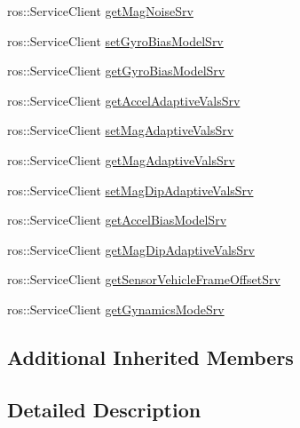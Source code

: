 \begin{DoxyCompactItemize}
\item 
ros\+::\+Service\+Client \hyperlink{classmicrostrain__mips__client_1_1ClMicrostainMips_affa7889c18ffeb92257cc63d1308a499}{get\+Mag\+Noise\+Srv}
\item 
ros\+::\+Service\+Client \hyperlink{classmicrostrain__mips__client_1_1ClMicrostainMips_a1a17a5d7fb3a071a779d2f1cd0e8a7e3}{set\+Gyro\+Bias\+Model\+Srv}
\item 
ros\+::\+Service\+Client \hyperlink{classmicrostrain__mips__client_1_1ClMicrostainMips_a63c964670a09edd036930cde7709e65e}{get\+Gyro\+Bias\+Model\+Srv}
\item 
ros\+::\+Service\+Client \hyperlink{classmicrostrain__mips__client_1_1ClMicrostainMips_ad3a6f23505de5793b9cf107306e8a649}{get\+Accel\+Adaptive\+Vals\+Srv}
\item 
ros\+::\+Service\+Client \hyperlink{classmicrostrain__mips__client_1_1ClMicrostainMips_a912d08b51a2ca485661ad28423d25bb3}{set\+Mag\+Adaptive\+Vals\+Srv}
\item 
ros\+::\+Service\+Client \hyperlink{classmicrostrain__mips__client_1_1ClMicrostainMips_a99f756ab750211672215ab77798d2a87}{get\+Mag\+Adaptive\+Vals\+Srv}
\item 
ros\+::\+Service\+Client \hyperlink{classmicrostrain__mips__client_1_1ClMicrostainMips_a6595253bdcad46fa555b7a43a0303cf8}{set\+Mag\+Dip\+Adaptive\+Vals\+Srv}
\item 
ros\+::\+Service\+Client \hyperlink{classmicrostrain__mips__client_1_1ClMicrostainMips_abe4cc6fa8c43eedd69b7dc53f2cc63f5}{get\+Accel\+Bias\+Model\+Srv}
\item 
ros\+::\+Service\+Client \hyperlink{classmicrostrain__mips__client_1_1ClMicrostainMips_a748591fd9e95377d11790521ba8cc853}{get\+Mag\+Dip\+Adaptive\+Vals\+Srv}
\item 
ros\+::\+Service\+Client \hyperlink{classmicrostrain__mips__client_1_1ClMicrostainMips_a95b89db0b03cffdb9b81cf1126e9e477}{get\+Sensor\+Vehicle\+Frame\+Offset\+Srv}
\item 
ros\+::\+Service\+Client \hyperlink{classmicrostrain__mips__client_1_1ClMicrostainMips_a8be11f7821b9951e39bf2df21b9b68be}{get\+Gynamics\+Mode\+Srv}
\end{DoxyCompactItemize}
\subsection*{Additional Inherited Members}


\subsection{Detailed Description}


